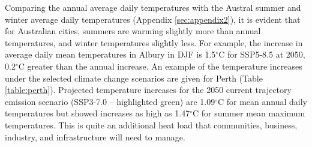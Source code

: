 \documentclass[utf8]{frontiersSCNS} %
\begin{document}
Comparing the annual average daily temperatures with the Austral summer and winter average daily temperatures (Appendix \ref{sec:appendix2}), it is evident that for Australian cities, summers are warming slightly more than annual temperatures, and winter temperatures slightly less.  For example, the increase in average daily mean temperatures in Albury in DJF is 1.5$^{\circ}$C for SSP5-8.5 at 2050, 0.2$^{\circ}$C greater than the annual increase. An example of the temperature increases under the selected climate change scenarios are given for Perth (Table \ref{table:perth}). Projected temperature increases for the 2050 current trajectory emission scenario (SSP3-7.0 – highlighted green) are 1.09$^{\circ}$C for mean annual daily temperatures but showed increases as high as 1.47$^{\circ}$C for summer mean maximum temperatures. This is quite an additional heat load that communities, business, industry, and infrastructure will need to manage.
\end{document}
